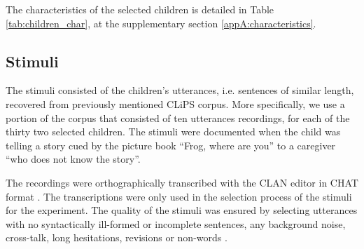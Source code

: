 The characteristics of the selected children is detailed in Table \ref{tab:children_char}, at the supplementary section \ref{appA:characteristics}. 

%
%
\subsection{Stimuli} \label{ss:stimuli}
%
The stimuli consisted of the children's utterances, i.e. sentences of similar length, recovered from previously mentioned CLiPS corpus. More specifically, we use a portion of the corpus that consisted of ten utterances recordings, for each of the thirty two selected children. The stimuli were documented when the child was telling a story cued by the picture book ``Frog, where are you'' \citep{Mayer_1969} to a caregiver ``who does not know the story''. 

The recordings were orthographically transcribed with the CLAN editor in CHAT format \cite{MacWhinney_2020}. The transcriptions were only used in the selection process of the stimuli for the experiment. The quality of the stimuli was ensured by selecting utterances with no syntactically ill-formed or incomplete sentences, any background noise, cross-talk, long hesitations, revisions or non-words \citep{Boonen_et_al_2021}. 

